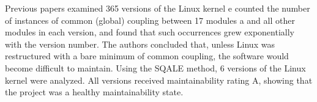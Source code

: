 Previous papers examined 365 versions of the Linux kernel e counted the number of instances of common (global) coupling between 17 modules a and all other modules in each version, and found that such occurrences grew exponentially with the version number. The authors concluded that, unless Linux was restructured with a bare minimum of common coupling, the software would become difficult to maintain. Using the SQALE method, 6 versions of the Linux kernel were analyzed. All versions received maintainability rating A, showing that the project was a healthy maintainability state.